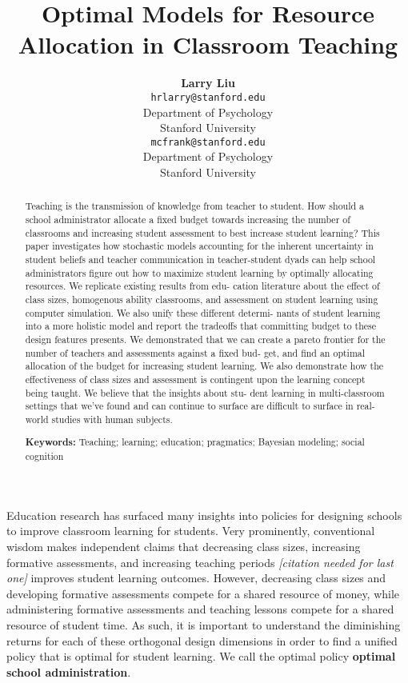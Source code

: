 \documentclass[10pt, letterpaper]{article}
\title{Optimal Models for Resource Allocation in Classroom Teaching}
\author{{\large \bf Larry Liu} \\ \texttt{hrlarry@stanford.edu} \\ Department of Psychology \\ Stanford University \And {\large \bf Michael C. Frank} \\ \texttt{mcfrank@stanford.edu} \\ Department of Psychology \\ Stanford University}
\begin{document}
\maketitle

\begin{abstract}
Teaching is the transmission of knowledge from teacher to student. How
should a school administrator allocate a fixed budget towards increasing
the number of classrooms and increasing student assessment to best
increase student learning? This paper investigates how stochastic models
accounting for the inherent uncertainty in student beliefs and teacher
communication in teacher-student dyads can help school administrators
figure out how to maximize student learning by optimally allocating
resources. We replicate existing results from edu- cation literature
about the effect of class sizes, homogenous ability classrooms, and
assessment on student learning using computer simulation. We also unify
these different determi- nants of student learning into a more holistic
model and report the tradeoffs that committing budget to these design
features presents. We demonstrated that we can create a pareto frontier
for the number of teachers and assessments against a fixed bud- get, and
find an optimal allocation of the budget for increasing student
learning. We also demonstrate how the effectiveness of class sizes and
assessment is contingent upon the learning concept being taught. We
believe that the insights about stu- dent learning in multi-classroom
settings that we've found and can continue to surface are difficult to
surface in real-world studies with human subjects.

\textbf{Keywords:}
Teaching; learning; education; pragmatics; Bayesian modeling; social
cognition
\end{abstract}

Education research has surfaced many insights into policies for
designing schools to improve classroom learning for students. Very
prominently, conventional wisdom makes independent claims that
decreasing class sizes, increasing formative assessments, and increasing
teaching periods \emph{{[}citation needed for last one{]}} improves
student learning outcomes. However, decreasing class sizes and
developing formative assessments compete for a shared resource of money,
while administering formative assessments and teaching lessons compete
for a shared resource of student time. As such, it is important to
understand the diminishing returns for each of these orthogonal design
dimensions in order to find a unified policy that is optimal for student
learning. We call the optimal policy \textbf{optimal school
administration}.
\end{document}
